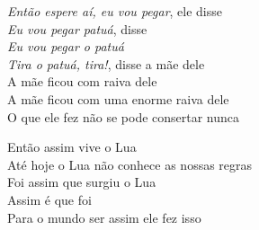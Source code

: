 \begin{linenumbers}\begingroup\raggedright
\noindent \emph{Então espere aí, eu vou pegar}, ele disse\\
\emph{Eu vou pegar patuá}, disse\\
\emph{Eu vou pegar o patuá}\\
\emph{Tira o patuá, tira!}, disse a mãe dele\\
A mãe ficou com raiva dele\\
A mãe ficou com uma enorme raiva dele\\
O que ele fez não se pode consertar nunca
\end{linenumbers}\endgroup

\bigskip

\begin{linenumbers}\begingroup\raggedright
\noindent Então assim vive o Lua\\
Até hoje o Lua não conhece as nossas regras\\
Foi assim que surgiu o Lua\\
Assim é que foi\\
Para o mundo ser assim ele fez isso
\end{linenumbers}\endgroup

\bigskip

